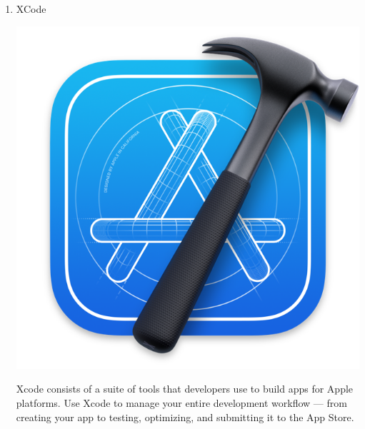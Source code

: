 \documentclass[conference]{IEEEtran}
\begin{document}
\begin{enumerate}
    \item XCode \\ 
    \centerline{\includegraphics[scale=0.3]{assets/xcode.png}}
    Xcode consists of a suite of tools that developers use to build apps for Apple platforms. Use Xcode to manage your entire development workflow — from creating your app to testing, optimizing, and submitting it to the App Store.\\ \\ \\ \\
    

\end{enumerate}
\end{document}
